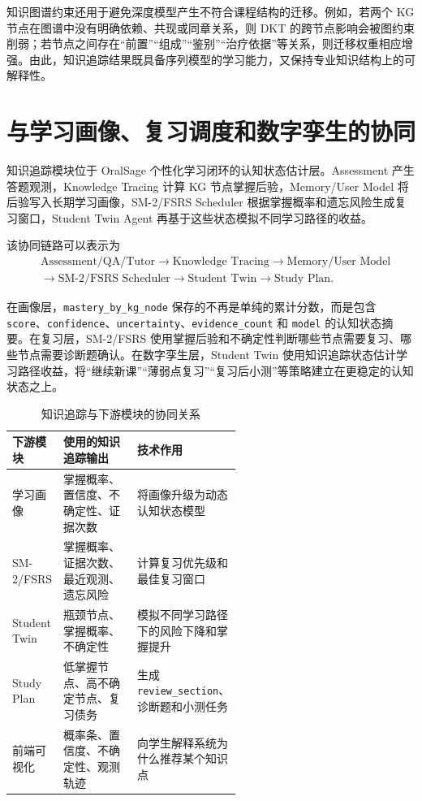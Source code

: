 知识图谱约束还用于避免深度模型产生不符合课程结构的迁移。例如，若两个 KG 节点在图谱中没有明确依赖、共现或同章关系，则 DKT 的跨节点影响会被图约束削弱；若节点之间存在“前置”“组成”“鉴别”“治疗依据”等关系，则迁移权重相应增强。由此，知识追踪结果既具备序列模型的学习能力，又保持专业知识结构上的可解释性。

\section{与学习画像、复习调度和数字孪生的协同}

知识追踪模块位于 OralSage 个性化学习闭环的认知状态估计层。Assessment 产生答题观测，Knowledge Tracing 计算 KG 节点掌握后验，Memory/User Model 将后验写入长期学习画像，SM-2/FSRS Scheduler 根据掌握概率和遗忘风险生成复习窗口，Student Twin Agent 再基于这些状态模拟不同学习路径的收益。

该协同链路可以表示为
\[
\begin{aligned}
&\text{Assessment/QA/Tutor}
\rightarrow
\text{Knowledge Tracing}
\rightarrow
\text{Memory/User Model}
\\
&\rightarrow
\text{SM-2/FSRS Scheduler}
\rightarrow
\text{Student Twin}
\rightarrow
\text{Study Plan}.
\end{aligned}
\]

在画像层，\texttt{mastery\_by\_kg\_node} 保存的不再是单纯的累计分数，而是包含 \texttt{score}、\texttt{confidence}、\texttt{uncertainty}、\texttt{evidence\_count} 和 \texttt{model} 的认知状态摘要。在复习层，SM-2/FSRS 使用掌握后验和不确定性判断哪些节点需要复习、哪些节点需要诊断题确认。在数字孪生层，Student Twin 使用知识追踪状态估计学习路径收益，将“继续新课”“薄弱点复习”“复习后小测”等策略建立在更稳定的认知状态之上。

\begin{table}[H]
  \centering
  \caption{知识追踪与下游模块的协同关系}
  \label{tab:kt-downstream}
  \begin{tabularx}{\linewidth}{p{0.22\linewidth}p{0.34\linewidth}X}
    \toprule
    下游模块 & 使用的知识追踪输出 & 技术作用 \\
    \midrule
    学习画像 & 掌握概率、置信度、不确定性、证据次数 & 将画像升级为动态认知状态模型 \\
    SM-2/FSRS & 掌握概率、证据次数、最近观测、遗忘风险 & 计算复习优先级和最佳复习窗口 \\
    Student Twin & 瓶颈节点、掌握概率、不确定性 & 模拟不同学习路径下的风险下降和掌握提升 \\
    Study Plan & 低掌握节点、高不确定节点、复习债务 & 生成 \texttt{review\_section}、诊断题和小测任务 \\
    前端可视化 & 概率条、置信度、不确定性、观测轨迹 & 向学生解释系统为什么推荐某个知识点 \\
    \bottomrule
  \end{tabularx}
\end{table}

